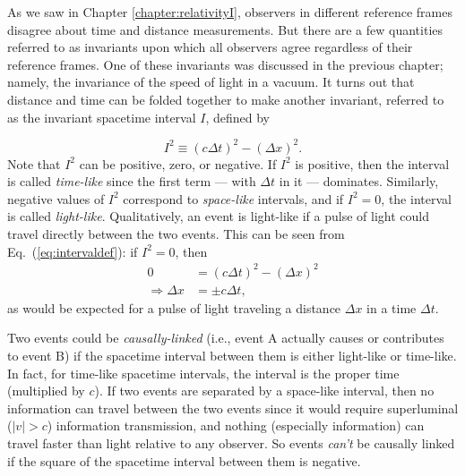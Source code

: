 \label{sec:spacetime_intervals}

As we saw in Chapter \ref{chapter:relativityI}, observers in different reference frames
disagree about time and distance measurements.  But there are a few
quantities referred to as invariants upon which all observers agree
regardless of their reference frames.  One of these invariants was
discussed in the previous chapter; namely, the invariance of the speed
of light in a vacuum.  It turns out that distance and time can be
folded together to make another invariant, referred to as the
invariant spacetime interval $I$, defined by

\begin{equation}
I^2 \equiv \left(c\Delta t\right)^2 - \left(\Delta x\right)^2.
\label{eq:intervaldef}
\end{equation}
Note that $I^2$ can be positive, zero, or negative.  If $I^2$ is
positive, then the interval is called {\em time-like\/}  since the first term
--- with $\Delta t$ in it --- dominates.  Similarly, negative values
of $I^2$ correspond to {\em space-like\/} intervals, and if $I^2 = 0$, the
interval is called {\em light-like\/}.  Qualitatively, an event is light-like
if a pulse of light could travel directly between the two events.
This can be seen from Eq.~(\ref{eq:intervaldef}): if $I^2 = 0$, then
\begin{align}
0 &= \left(c\Delta t\right)^2 - \left(\Delta x\right)^2  \nonumber \\
\Rightarrow \Delta x &= \pm c \Delta t,
\end{align}
as would be expected for a pulse of light traveling a distance $\Delta
x$ in a time $\Delta t$.

Two events could be {\em causally-linked} (i.e., event A actually
causes or contributes to event B) if the spacetime interval between
them is either light-like or time-like.  In fact, for time-like
spacetime intervals, the interval is the proper time (multiplied by $c$).  
If two events are separated by a space-like interval, then no 
information can travel between the two events since it would require 
superluminal ($|v| > c$) information transmission, and nothing 
(especially information) can travel faster than light relative to 
any observer.  So events {\em can't} be causally linked if the square 
of the spacetime interval between them is negative.


